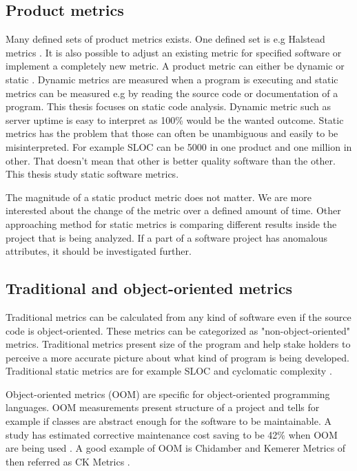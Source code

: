 \subsection{Product metrics}

Many defined sets of product metrics exists. One defined set is e.g Halstead metrics \cite{al2005analysis}. It is also possible to adjust an existing metric for specified software or implement a completely new metric. A product metric can either be dynamic or static \cite{sommerville2011software}. Dynamic metrics are measured when a program is executing and static metrics can be measured e.g by reading the source code or documentation of a program. This thesis focuses on static code analysis. Dynamic metric such as server uptime is easy to interpret as 100\% would be the wanted outcome. Static metrics has the problem that those can often be unambiguous and easily to be misinterpreted. For example SLOC can be 5000 in one product and one million in other. That doesn't mean that other is better quality software than the other. This thesis study static software metrics.

The magnitude of a static product metric does not matter. We are more interested about the change of the metric over a defined amount of time. Other approaching method for static metrics is comparing different results inside the project that is being analyzed. If a part of a software project has anomalous attributes, it should be investigated further. 

\subsection{Traditional and object-oriented metrics}

Traditional metrics can be calculated from any kind of software even if the source code is object-oriented. These metrics can be categorized as "non-object-oriented" metrics. Traditional metrics present size of the program and help stake holders to perceive a more accurate picture about what kind of program is being developed. Traditional static metrics are for example SLOC and cyclomatic complexity \cite{fenton1997software}.  

Object-oriented metrics (OOM) are specific for object-oriented programming languages. OOM measurements present structure of a project and tells for example if classes are abstract enough for the software to be maintainable. A study has estimated corrective maintenance cost saving to be 42\% when OOM are being used \cite{sarker2005overview}. A good example of OOM is Chidamber and Kemerer Metrics of then referred as CK Metrics \cite{chidamber1994metrics}.

